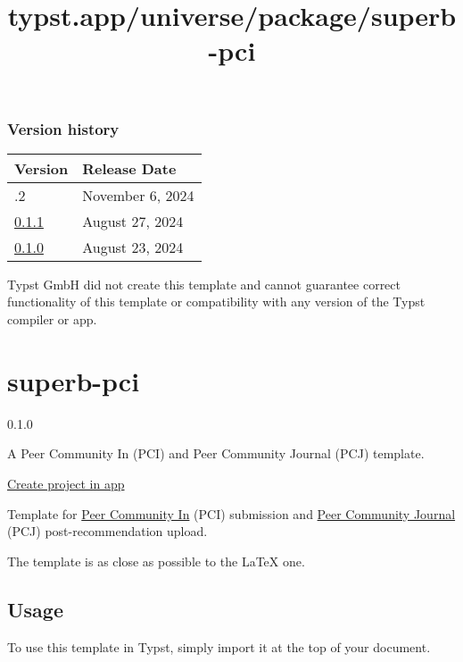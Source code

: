 \label{versions}
\subsubsection{Version history}\label{version-history}

\begin{longtable}[]{@{}ll@{}}
\toprule\noalign{}
Version & Release Date \\
\midrule\noalign{}
\endhead
\bottomrule\noalign{}
\endlastfoot
0.1.2 & November 6, 2024 \\
\href{https://typst.app/universe/package/vienna-tech/0.1.1/}{0.1.1} &
August 27, 2024 \\
\href{https://typst.app/universe/package/vienna-tech/0.1.0/}{0.1.0} &
August 23, 2024 \\
\end{longtable}

Typst GmbH did not create this template and cannot guarantee correct
functionality of this template or compatibility with any version of the
Typst compiler or app.


\title{typst.app/universe/package/superb-pci}

\label{banner}
\label{template-thumbnail}

\section{superb-pci}\label{superb-pci}

{ 0.1.0 }

A Peer Community In (PCI) and Peer Community Journal (PCJ) template.

\href{/app?template=superb-pci&version=0.1.0}{Create project in app}

\label{readme}
Template for \href{https://peercommunityin.org/}{Peer Community In}
(PCI) submission and \href{https://peercommunityjournal.org/}{Peer
Community Journal} (PCJ) post-recommendation upload.

The template is as close as possible to the LaTeX one.

\subsection{Usage}\label{usage}

To use this template in Typst, simply import it at the top of your
document.

